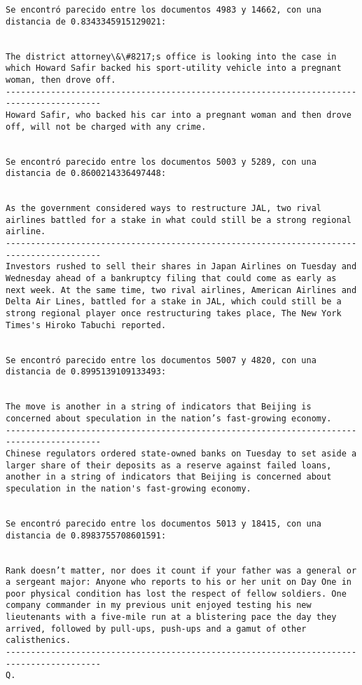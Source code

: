\documentclass[11pt]{article}
\begin{document}
\begin{Verbatim}[commandchars=\\\{\}]
Se encontró parecido entre los documentos 4983 y 14662, con una distancia de 0.8343345915129021:


The district attorney\&\#8217;s office is looking into the case in which Howard Safir backed his sport-utility vehicle into a pregnant woman, then drove off.
-----------------------------------------------------------------------------------------
Howard Safir, who backed his car into a pregnant woman and then drove off, will not be charged with any crime.


Se encontró parecido entre los documentos 5003 y 5289, con una distancia de 0.8600214336497448:


As the government considered ways to restructure JAL, two rival airlines battled for a stake in what could still be a strong regional airline.
-----------------------------------------------------------------------------------------
Investors rushed to sell their shares in Japan Airlines on Tuesday and Wednesday ahead of a bankruptcy filing that could come as early as next week. At the same time, two rival airlines, American Airlines and Delta Air Lines, battled for a stake in JAL, which could still be a strong regional player once restructuring takes place, The New York Times's Hiroko Tabuchi reported.


Se encontró parecido entre los documentos 5007 y 4820, con una distancia de 0.8995139109133493:


The move is another in a string of indicators that Beijing is concerned about speculation in the nation’s fast-growing economy.
-----------------------------------------------------------------------------------------
Chinese regulators ordered state-owned banks on Tuesday to set aside a larger share of their deposits as a reserve against failed loans, another in a string of indicators that Beijing is concerned about speculation in the nation's fast-growing economy.


Se encontró parecido entre los documentos 5013 y 18415, con una distancia de 0.8983755708601591:


Rank doesn’t matter, nor does it count if your father was a general or a sergeant major: Anyone who reports to his or her unit on Day One in poor physical condition has lost the respect of fellow soldiers. One company commander in my previous unit enjoyed testing his new lieutenants with a five-mile run at a blistering pace the day they arrived, followed by pull-ups, push-ups and a gamut of other calisthenics.
-----------------------------------------------------------------------------------------
Q.



\end{Verbatim}
\end{document}
